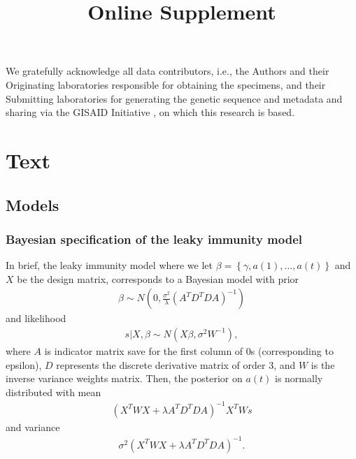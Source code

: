 \documentclass{article}
\newcommand{\beginsupplement}{
  \setcounter{table}{1}  
  \renewcommand{\thetable}{S\arabic{table}} 
  \setcounter{figure}{1} 
  \renewcommand{\thefigure}{S\arabic{figure}}
  \setcounter{section}{0} 
  \renewcommand{\thesection}{S\arabic{section}}
}
\begin{document}
We gratefully acknowledge all data contributors, i.e., the Authors and their Originating laboratories responsible for obtaining the specimens, and their Submitting laboratories for generating the genetic sequence and metadata and sharing via the GISAID Initiative \citep{elbe2017data}, on which this research is based.



\newpage


\newpage
\beginsupplement
\title{Online Supplement} 
\maketitle
\section{Text}  
\subsection{Models}
\subsubsection{Bayesian specification of the leaky immunity model}\label{supp:bayesleaky}
In brief, the leaky immunity model where we let $\beta = \left \{  \gamma, a(1),\dots, a(t) \right \}$ and $X$ be the design matrix, corresponds to a Bayesian model with prior 
\begin{align*}
    \beta \sim N\left ( 0,  \frac{\sigma^2 }{ \lambda} \left ( A^TD^TDA \right ) ^{-1}  \right )
\end{align*} and likelihood 
\begin{align*}
    s|X,\beta \sim N \left( X\beta, \sigma^2W^{-1} \right ),
\end{align*} where $A$ is indicator matrix save for the first column of $0$s (corresponding to epsilon), $D$ represents the discrete derivative matrix of order $3$, and $W$ is the inverse variance weights matrix. Then, the posterior on $a(t)$ is normally distributed with mean 
\begin{align*}
    \left ( X^TWX + \lambda A^TD^TDA \right )^{-1}X^TWs
\end{align*} 
and variance 
\begin{align*}
    \sigma^2 (X^TWX + \lambda A^TD^TDA)^{-1}.
\end{align*}
\end{document}
